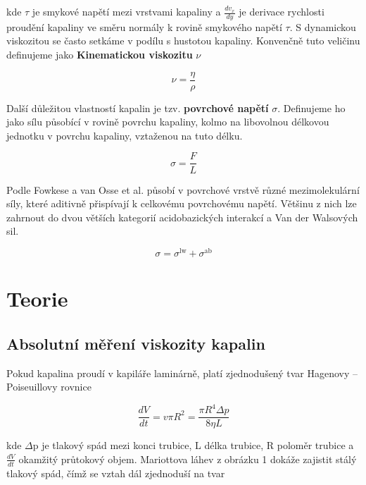 \documentclass[a4paper,11pt]{article}
\begin{document}
kde $\tau$ je smykové napětí mezi vrstvami kapaliny a  $\frac{dv_x}{dy}$ je derivace rychlosti proudění kapaliny ve
směru normály k rovině smykového napětí $\tau$. S dynamickou viskozitou se často setkáme v podílu s hustotou kapaliny. Konvenčně tuto veličinu definujeme jako \textbf{Kinematickou viskozitu} $\nu$

\begin{equation}
\nu = \frac{\eta}{\rho}
\end{equation}

Další důležitou vlastností kapalin je tzv. \textbf{povrchové napětí} $\sigma$. Definujeme ho jako sílu působící v rovině povrchu kapaliny, kolmo na libovolnou délkovou jednotku v povrchu kapaliny, vztaženou na tuto délku.

\begin{equation}
  \sigma = \frac{F}{L}
\end{equation}

Podle Fowkese a van Osse et al. působí v povrchové vrstvě různé mezimolekulární síly, které aditivně přispívají k celkovému povrchovému napětí. Většinu z nich lze zahrnout do dvou větších kategorií acidobazických interakcí a Van der Walsových sil.

\begin{equation}
  \sigma = \sigma^{\text{lw}} + \sigma^{\text{ab}}
\end{equation}

\newpage

\section{Teorie}

\subsection{Absolutní měření viskozity kapalin}

Pokud kapalina proudí v kapiláře laminárně, platí zjednodušený tvar Hagenovy – Poiseuillovy rovnice

\begin{equation}
\frac{dV}{dt} = v \pi R^2 = \frac{\pi R^4 \Delta p }{8 \eta L} 
\end{equation}

\noindent
kde $\Delta$p je tlakový spád mezi konci trubice, L délka trubice, R poloměr trubice a $\frac{dV}{dt}$ okamžitý průtokový objem. Mariottova láhev z obrázku 1 dokáže zajistit stálý tlakový spád, čímž se vztah dál zjednoduší na tvar
\end{document}
